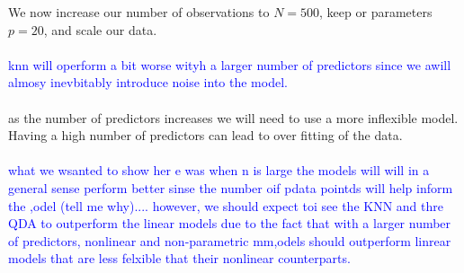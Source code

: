 \documentclass[11pt, oneside]{article}
\begin{document}
We now increase our number of observations to $N=500$, keep or parameters $p=20$, and scale our data.\\
\\

\textcolor{blue}{knn will operform a bit worse wityh a larger number of predictors since we awill almosy inevbitably introduce noise into the model.}\\
\\
as the number of predictors increases we will need to use a more inflexible model. Having a high number of predictors can lead to over fitting of the data.\\
\\
\textcolor{blue}{what we wsanted to show her e was when n is large the models will will in a general sense perform better sinse the number oif pdata pointds will help inform the ,odel (\textcolor{blue}{tell me why)}.... however, we should expect toi see the KNN and thre QDA to outperform the linear models due to the fact that with a larger number of predictors, nonlinear and non-parametric mm,odels should outperform linrear models that are less felxible that their nonlinear counterparts. }




















\end{document}
